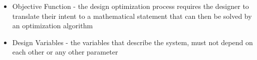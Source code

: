 \documentclass{journal}
\begin{document}
\begin{itemize}
		\item Objective Function - the design optimization process requires the designer to translate their intent to a mathematical statement that can then be solved by an optimization algorithm
		\item Design Variables - the variables that describe the system, must not depend on each other or any other parameter
	\end{itemize}
	
	
\end{document}
